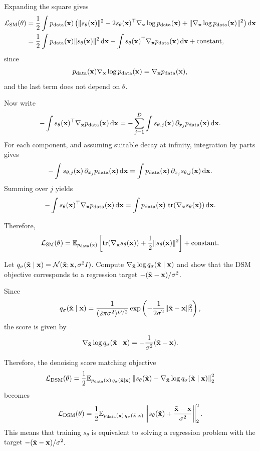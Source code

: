 \begin{solution}
Expanding the square gives
\begin{align*}
{\mathcal L}_{\text{SM}}(\theta)
&=
\frac12 \int p_{\text{data}}({ \mathbf{x}})
\left(
\|s_\theta({ \mathbf{x}})\|^2
-2 s_\theta({ \mathbf{x}})^\top \nabla_{ \mathbf{x}} \log p_{\text{data}}({ \mathbf{x}})
+\|\nabla_{ \mathbf{x}} \log p_{\text{data}}({ \mathbf{x}})\|^2
\right){\text{d}}{ \mathbf{x}} \\
&=
\frac12 \int p_{\text{data}}({ \mathbf{x}})\|s_\theta({ \mathbf{x}})\|^2\,{\text{d}}{ \mathbf{x}}
-\int s_\theta({ \mathbf{x}})^\top \nabla_{ \mathbf{x}} p_{\text{data}}({ \mathbf{x}})\,{\text{d}}{ \mathbf{x}}
+\text{constant},
\end{align*}
since
\[
p_{\text{data}}({ \mathbf{x}})\nabla_{ \mathbf{x}} \log p_{\text{data}}({ \mathbf{x}})=\nabla_{ \mathbf{x}} p_{\text{data}}({ \mathbf{x}}),
\]
and the last term does not depend on $\theta$.

Now write
\[
-\int s_\theta({ \mathbf{x}})^\top \nabla_{ \mathbf{x}} p_{\text{data}}({ \mathbf{x}})\,{\text{d}}{ \mathbf{x}}
=
-\sum_{j=1}^D \int s_{\theta,j}({ \mathbf{x}})\,\partial_{x_j}p_{\text{data}}({ \mathbf{x}})\,{\text{d}}{ \mathbf{x}}.
\]
For each component, and assuming suitable decay at infinity, integration by parts gives
\[
-\int s_{\theta,j}({ \mathbf{x}})\,\partial_{x_j}p_{\text{data}}({ \mathbf{x}})\,{\text{d}}{ \mathbf{x}}
=
\int p_{\text{data}}({ \mathbf{x}})\,\partial_{x_j}s_{\theta,j}({ \mathbf{x}})\,{\text{d}}{ \mathbf{x}}.
\]
Summing over $j$ yields
\[
-\int s_\theta({ \mathbf{x}})^\top \nabla_{ \mathbf{x}} p_{\text{data}}({ \mathbf{x}})\,{\text{d}}{ \mathbf{x}}
=
\int p_{\text{data}}({ \mathbf{x}})\,\operatorname{tr}(\nabla_{ \mathbf{x}} s_\theta({ \mathbf{x}}))\,{\text{d}}{ \mathbf{x}}.
\]

Therefore,
\[
{\mathcal L}_{\text{SM}}(\theta)
=
\mathbb{E}_{p_{\text{data}}({ \mathbf{x}})}
\left[
\operatorname{tr}(\nabla_{ \mathbf{x}} s_\theta({ \mathbf{x}}))+\frac12\|s_\theta({ \mathbf{x}})\|^2
\right]
+\text{constant}.
\]
\end{solution}



\begin{exercise}
Let $q_\sigma(\tilde{{ \mathbf{x}}}\mid{ \mathbf{x}})={\mathcal N}(\tilde{{ \mathbf{x}}};{ \mathbf{x}},\sigma^2 I)$.  
Compute $\nabla_{\tilde{{ \mathbf{x}}}}\log q_\sigma(\tilde{{ \mathbf{x}}}\mid{ \mathbf{x}})$ and show that the DSM objective corresponds to a regression target $-(\tilde{{ \mathbf{x}}}-{ \mathbf{x}})/\sigma^2$.
\end{exercise}

\begin{solution}
Since
\[
q_\sigma(\tilde{{ \mathbf{x}}}\mid{ \mathbf{x}})
=
\frac{1}{(2\pi\sigma^2)^{D/2}}
\exp\left(
-\frac{1}{2\sigma^2}\|\tilde{{ \mathbf{x}}}-{ \mathbf{x}}\|_2^2
\right),
\]
the score is given by 
\[
\nabla_{\tilde{{ \mathbf{x}}}}\log q_\sigma(\tilde{{ \mathbf{x}}}\mid{ \mathbf{x}})
=
-\frac{1}{\sigma^2}(\tilde{{ \mathbf{x}}}-{ \mathbf{x}}).
\]

Therefore, the denoising score matching objective
\[
{\mathcal L}_{\mathrm{DSM}}(\theta)
=
\frac12
\mathbb{E}_{p_{\mathrm{data}}({ \mathbf{x}})\,q_\sigma(\tilde{{ \mathbf{x}}}\mid{ \mathbf{x}})}
\left\|
s_\theta(\tilde{{ \mathbf{x}}})
-
\nabla_{\tilde{{ \mathbf{x}}}}\log q_\sigma(\tilde{{ \mathbf{x}}}\mid{ \mathbf{x}})
\right\|_2^2
\]
becomes
\[
{\mathcal L}_{\mathrm{DSM}}(\theta)
=
\frac12
\mathbb{E}_{p_{\mathrm{data}}({ \mathbf{x}})\,q_\sigma(\tilde{{ \mathbf{x}}}\mid{ \mathbf{x}})}
\left\|
s_\theta(\tilde{{ \mathbf{x}}})
+
\frac{\tilde{{ \mathbf{x}}}-{ \mathbf{x}}}{\sigma^2}
\right\|_2^2.
\]
This means that training $s_\theta$ is equivalent to solving a regression problem with the target
\(
-(\tilde{{ \mathbf{x}}}-{ \mathbf{x}})/\sigma^2.
\)
\end{solution}


